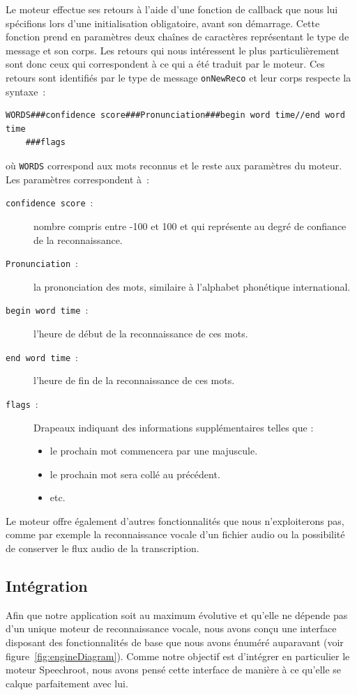 Le moteur effectue ses retours à l'aide d'une fonction de callback que nous lui spécifions lors d'une initialisation obligatoire, avant son démarrage.
Cette fonction prend en paramètres deux chaînes de caractères représentant le type de message et son corps.
Les retours qui nous intéressent le plus particulièrement sont donc ceux qui correspondent à ce qui a été traduit par le moteur.
Ces retours sont identifiés par le type de message \texttt{onNewReco} et leur corps respecte la syntaxe~:
\begin{verbatim}
WORDS###confidence score###Pronunciation###begin word time//end word time
    ###flags
\end{verbatim}
où \texttt{WORDS} correspond aux mots reconnus et le reste aux paramètres du moteur.
Les paramètres correspondent à~:
\begin{description}
\item [\texttt{confidence score}~:] nombre compris entre -100 et 100 et qui représente au degré de confiance de la reconnaissance.
\item [\texttt{Pronunciation}~:] la prononciation des mots, similaire à l'alphabet phonétique international.
\item [\texttt{begin word time}~:] l'heure de début de la reconnaissance de ces mots.
\item [\texttt{end word time}~:] l'heure de fin de la reconnaissance de ces mots.
\item [\texttt{flags}~:] Drapeaux indiquant des informations supplémentaires telles que :
\begin{itemize}
\item le prochain mot commencera par une majuscule.
\item le prochain mot sera collé au précédent.
\item etc.
\end{itemize}
\end{description}

Le moteur offre également d'autres fonctionnalités que nous n'exploiterons pas, comme par exemple la reconnaissance vocale d'un fichier audio ou la possibilité de conserver le flux audio de la transcription.

\subsection{Intégration}
Afin que notre application soit au maximum évolutive et qu'elle ne dépende pas d'un unique moteur de reconnaissance vocale, nous avons conçu une interface disposant des fonctionnalités de base que nous avons énuméré auparavant (voir figure~\ref{fig:engineDiagram}).
Comme notre objectif est d'intégrer en particulier le moteur Speechroot, nous avons pensé cette interface de manière à ce qu'elle se calque parfaitement avec lui.

